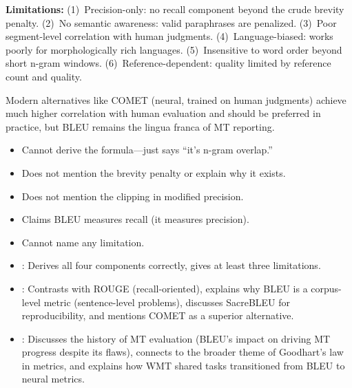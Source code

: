 \begin{interviewq}
\textbf{Limitations:}
(1)~Precision-only: no recall component beyond the crude brevity penalty.
(2)~No semantic awareness: valid paraphrases are penalized.
(3)~Poor segment-level correlation with human judgments.
(4)~Language-biased: works poorly for morphologically rich languages.
(5)~Insensitive to word order beyond short n-gram windows.
(6)~Reference-dependent: quality limited by reference count and quality.

Modern alternatives like COMET (neural, trained on human judgments) achieve
much higher correlation with human evaluation and should be preferred in
practice, but BLEU remains the lingua franca of MT reporting.

\redflags
\begin{itemize}
    \item Cannot derive the formula---just says ``it's n-gram overlap.''
    \item Does not mention the brevity penalty or explain why it exists.
    \item Does not mention the clipping in modified precision.
    \item Claims BLEU measures recall (it measures precision).
    \item Cannot name any limitation.
\end{itemize}


\goodgreat
\begin{itemize}
    \item {}: Derives all four components correctly, gives at least
          three limitations.
    \item {}: Contrasts with ROUGE (recall-oriented), explains
          why BLEU is a corpus-level metric (sentence-level problems), discusses
          SacreBLEU for reproducibility, and mentions COMET as a superior
          alternative.
    \item {}: Discusses the history of MT evaluation (BLEU's
          impact on driving MT progress despite its flaws), connects to the
          broader theme of Goodhart's law in metrics, and explains how WMT
          shared tasks transitioned from BLEU to neural metrics.
\end{itemize}

\end{interviewq}

